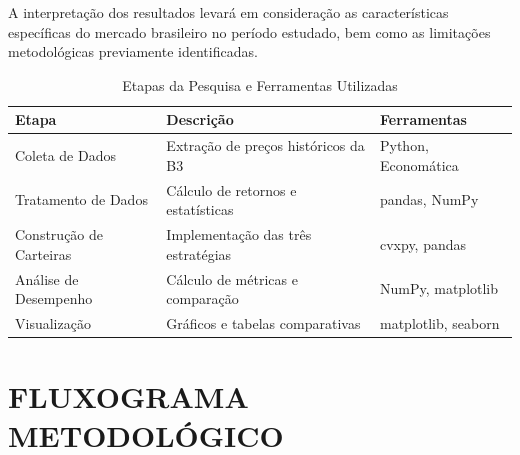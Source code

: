 A interpretação dos resultados levará em consideração as características específicas do mercado brasileiro no período estudado, bem como as limitações metodológicas previamente identificadas.


\begin{table}[h]
\centering
\caption{Etapas da Pesquisa e Ferramentas Utilizadas}
\begin{tabular}{|p{4cm}|p{4cm}|p{4cm}|}
\hline
\textbf{Etapa} & \textbf{Descrição} & \textbf{Ferramentas} \\
\hline
Coleta de Dados & Extração de preços históricos da B3 & Python, Economática \\
\hline
Tratamento de Dados & Cálculo de retornos e estatísticas & pandas, NumPy \\
\hline
Construção de Carteiras & Implementação das três estratégias & cvxpy, pandas \\
\hline
Análise de Desempenho & Cálculo de métricas e comparação & NumPy, matplotlib \\
\hline
Visualização & Gráficos e tabelas comparativas & matplotlib, seaborn \\
\hline
\end{tabular}
\label{tab:etapas_pesquisa}
\end{table}

\section{FLUXOGRAMA METODOLÓGICO}

